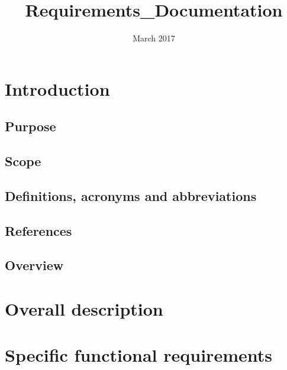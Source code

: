 \documentclass{article}
\title{Requirements\_Documentation}
\author{}
\date{March 2017}
\begin{document}
\maketitle






\section{Introduction}

\subsection{Purpose}

\subsection{Scope}

\subsection{Definitions, acronyms and abbreviations}

\subsection{References}

\subsection{Overview}

\section{Overall description}

\section{Specific functional requirements}
\end{document}
